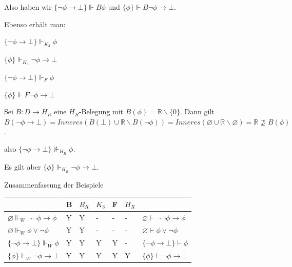 \documentclass[a4paper]{article}
\begin{document}
\begin{multicols}{3}
\begin{itemize*}
          Also haben wir $\{\lnot\phi\rightarrow\bot\}\Vdash B\phi$ und
          $\{\phi\}\Vdash B\lnot \phi\rightarrow\bot$.
    \item
          Ebenso erhält man:

          \begin{itemize*}
            \item
                  $\{\lnot\phi\rightarrow\bot\}\Vdash_{K_3} \phi$
            \item
                  $\{\phi\}\Vdash_{K_3} \lnot\phi\rightarrow\bot$
            \item
                  $\{\lnot\phi\rightarrow\bot\}\Vdash_F\phi$
            \item
                  $\{\phi\}\Vdash F\lnot\phi\rightarrow\bot$
          \end{itemize*}
    \item
          Sei $B:D\rightarrow H_R$ eine $H_R$-Belegung mit
          $B(\phi) =\mathbb{R}\backslash\{0\}$. Dann gilt
          $B(\lnot\phi\rightarrow\bot) = Inneres(B(\bot )\cup \mathbb{R}\backslash B(\lnot\phi))= Inneres(\varnothing \cup \mathbb{R}\backslash\varnothing)= \mathbb{R} \not\supseteq B(\phi)$.

          also $\{\lnot\phi\rightarrow\bot\}\not\Vdash_{H_R} \phi$.

          Es gilt aber $\{\phi\}\Vdash_{H_R}\lnot \phi\rightarrow\bot$.
  \end{itemize*}

  Zusammenfassung der Beispiele

  \begin{tabular}{lllllll}
                                                       & B & $B_R$ & $K_3$ & F & $H_R$ & \\\hline
    $\varnothing\Vdash_W\lnot\lnot\phi\rightarrow\phi$ & Y & Y     & -     & - & -     &
    $\varnothing\vdash \lnot\lnot\phi\rightarrow\phi$                                    \\
    $\varnothing\Vdash_W\phi\vee\lnot\phi$             & Y & Y     & -     & - & -     &
    $\varnothing\vdash\phi\vee\lnot\phi$                                                 \\
    $\{\lnot\phi\rightarrow\bot\}\Vdash_W\phi$         & Y & Y     & Y     & Y & -     &
    $\{\lnot\phi\rightarrow\bot\}\vdash\phi$                                             \\
    $\{\phi\}\Vdash_W\lnot\phi\rightarrow\bot$         & Y & Y     & Y     & Y & Y     &
    $\{\phi\}\vdash\lnot\phi\rightarrow\bot$                                             \\
  \end{tabular}


\end{multicols}
\end{document}
